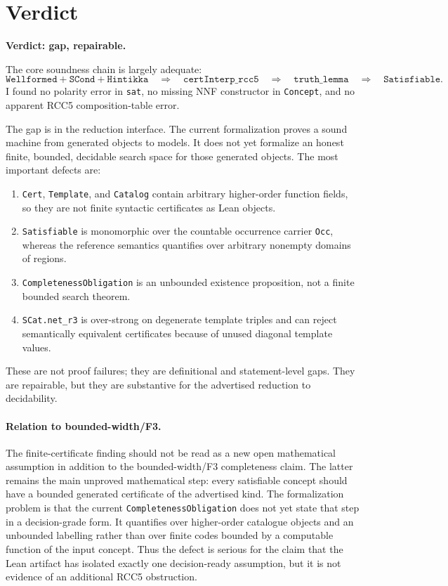\documentclass[11pt]{article}
\begin{document}
\section{Verdict}

\textbf{Verdict: gap, repairable.}

The core soundness chain is largely adequate:
\[
  \texttt{Wellformed} + \texttt{SCond} + \texttt{Hintikka}
  \quad\Longrightarrow\quad
  \texttt{certInterp\_rcc5}
  \quad\Longrightarrow\quad
  \texttt{truth\_lemma}
  \quad\Longrightarrow\quad
  \texttt{Satisfiable}.
\]
I found no polarity error in \texttt{sat}, no missing NNF constructor in
\texttt{Concept}, and no apparent RCC5 composition-table error.

The gap is in the reduction interface.  The current formalization proves a
sound machine from generated objects to models.  It does not yet formalize an
honest finite, bounded, decidable search space for those generated objects.
The most important defects are:
\begin{enumerate}
  \item \texttt{Cert}, \texttt{Template}, and \texttt{Catalog} contain arbitrary
        higher-order function fields, so they are not finite syntactic
        certificates as Lean objects.
  \item \texttt{Satisfiable} is monomorphic over the countable occurrence
        carrier \texttt{Occ}, whereas the reference semantics quantifies over
        arbitrary nonempty domains of regions.
  \item \texttt{CompletenessObligation} is an unbounded existence proposition,
        not a finite bounded search theorem.
  \item \texttt{SCat.net\_r3} is over-strong on degenerate template triples and
        can reject semantically equivalent certificates because of unused
        diagonal template values.
\end{enumerate}

These are not proof failures; they are definitional and statement-level gaps.
They are repairable, but they are substantive for the advertised reduction to
decidability.

\paragraph{Relation to bounded-width/F3.}
The finite-certificate finding should not be read as a new open mathematical
assumption in addition to the bounded-width/F3 completeness claim.  The latter
remains the main unproved mathematical step: every satisfiable concept should
have a bounded generated certificate of the advertised kind.  The formalization
problem is that the current \texttt{CompletenessObligation} does not yet state
that step in a decision-grade form.  It quantifies over higher-order catalogue
objects and an unbounded labelling rather than over finite codes bounded by a
computable function of the input concept.  Thus the defect is serious for the
claim that the Lean artifact has isolated exactly one decision-ready
assumption, but it is not evidence of an additional RCC5 obstruction.
\end{document}
